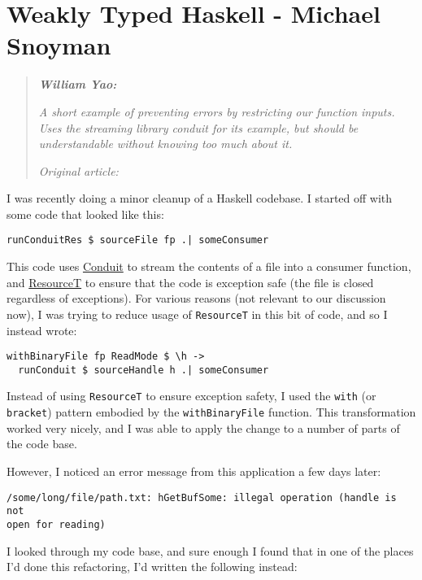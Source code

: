 \chapter{Weakly Typed Haskell - Michael Snoyman}

\begin{quotation}
\noindent\textit{\textbf{William Yao:}}

\textit{A short example of preventing errors by restricting our function inputs. Uses the streaming library conduit for its example, but should be understandable without knowing too much about it.}

\vspace{\baselineskip}
\noindent\textit{Original article: \cite{weakly_typed_haskell}}
\end{quotation}


I was recently doing a minor cleanup of a Haskell codebase. I started off with some code that looked like this:

\begin{verbatim}
runConduitRes $ sourceFile fp .| someConsumer
\end{verbatim}
This code uses \href{https://haskell-lang.org/library/conduit}{Conduit} to stream the contents of a file into a consumer function, and \href{https://www.fpcomplete.com/blog/2017/06/understanding-resourcet}{ResourceT} to ensure that the code is exception safe (the file is closed regardless of exceptions). For various reasons (not relevant to our discussion now), I was trying to reduce usage of \texttt{ResourceT} in this bit of code, and so I instead wrote:

\begin{verbatim}
withBinaryFile fp ReadMode $ \h ->
  runConduit $ sourceHandle h .| someConsumer
\end{verbatim}
Instead of using \texttt{ResourceT} to ensure exception safety, I used the \texttt{with} (or \texttt{bracket}) pattern embodied by the \texttt{withBinaryFile} function. This transformation worked very nicely, and I was able to apply the change to a number of parts of the code base.

However, I noticed an error message from this application a few days later:

\begin{verbatim}
/some/long/file/path.txt: hGetBufSome: illegal operation (handle is not 
open for reading)
\end{verbatim}
I looked through my code base, and sure enough I found that in one of the places I'd done this refactoring, I'd written the following instead:

